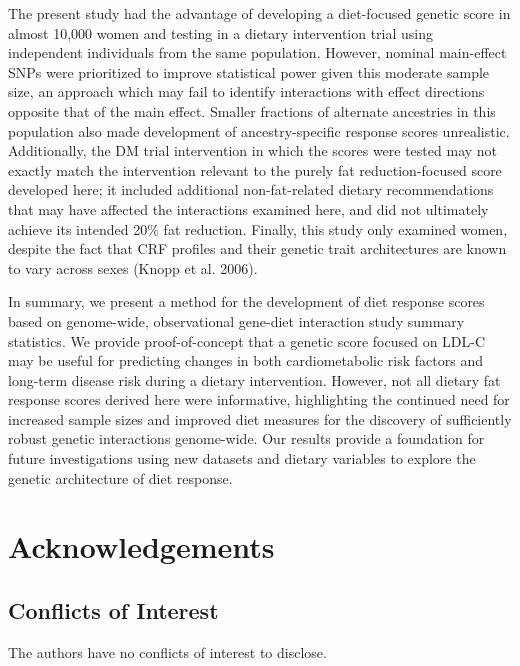 \documentclass[]{article}
\begin{document}
The present study had the advantage of developing a diet-focused genetic
score in almost 10,000 women and testing in a dietary intervention trial
using independent individuals from the same population. However, nominal
main-effect SNPs were prioritized to improve statistical power given
this moderate sample size, an approach which may fail to identify
interactions with effect directions opposite that of the main effect.
Smaller fractions of alternate ancestries in this population also made
development of ancestry-specific response scores unrealistic.
Additionally, the DM trial intervention in which the scores were tested
may not exactly match the intervention relevant to the purely fat
reduction-focused score developed here; it included additional
non-fat-related dietary recommendations that may have affected the
interactions examined here, and did not ultimately achieve its intended
20\% fat reduction. Finally, this study only examined women, despite the
fact that CRF profiles and their genetic trait architectures are known
to vary across sexes (Knopp et al. 2006).

In summary, we present a method for the development of diet response
scores based on genome-wide, observational gene-diet interaction study
summary statistics. We provide proof-of-concept that a genetic score
focused on LDL-C may be useful for predicting changes in both
cardiometabolic risk factors and long-term disease risk during a dietary
intervention. However, not all dietary fat response scores derived here
were informative, highlighting the continued need for increased sample
sizes and improved diet measures for the discovery of sufficiently
robust genetic interactions genome-wide. Our results provide a
foundation for future investigations using new datasets and dietary
variables to explore the genetic architecture of diet response.

\hypertarget{acknowledgements}{%
\section{Acknowledgements}\label{acknowledgements}}

\hypertarget{conflicts-of-interest}{%
\subsection{Conflicts of Interest}\label{conflicts-of-interest}}

The authors have no conflicts of interest to disclose.
\end{document}
